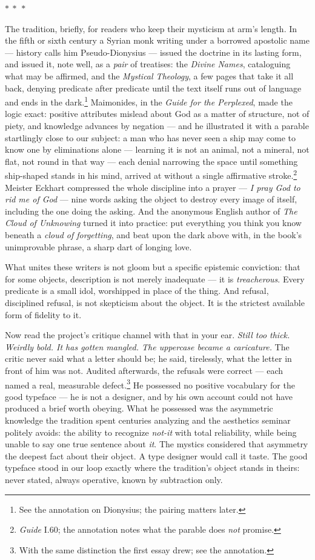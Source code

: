 \documentclass[11pt]{article}
\newcommand{\separator}{\begin{center}\vspace{2pt}$\ast\ \ast\ \ast$\vspace{2pt}\end{center}}
\begin{document}
\separator

The tradition, briefly, for readers who keep their mysticism at arm's length. In the fifth or sixth century a Syrian monk writing under a borrowed apostolic name — history calls him Pseudo-Dionysius — issued the doctrine in its lasting form, and issued it, note well, as a \emph{pair} of treatises: the \emph{Divine Names}, cataloguing what may be affirmed, and the \emph{Mystical Theology}, a few pages that take it all back, denying predicate after predicate until the text itself runs out of language and ends in the dark.\footnote{See the annotation on Dionysius; the pairing matters later.} Maimonides, in the \emph{Guide for the Perplexed}, made the logic exact: positive attributes mislead about God as a matter of structure, not of piety, and knowledge advances by negation — and he illustrated it with a parable startlingly close to our subject: a man who has never seen a ship may come to know one by eliminations alone — learning it is not an animal, not a mineral, not flat, not round in that way — each denial narrowing the space until something ship-shaped stands in his mind, arrived at without a single affirmative stroke.\footnote{\emph{Guide} I.60; the annotation notes what the parable does \emph{not} promise.} Meister Eckhart compressed the whole discipline into a prayer — \emph{I pray God to rid me of God} — nine words asking the object to destroy every image of itself, including the one doing the asking. And the anonymous English author of \emph{The Cloud of Unknowing} turned it into practice: put everything you think you know beneath a \emph{cloud of forgetting}, and beat upon the dark above with, in the book's unimprovable phrase, a sharp dart of longing love.

What unites these writers is not gloom but a specific epistemic conviction: that for some objects, description is not merely inadequate — it is \emph{treacherous}. Every predicate is a small idol, worshipped in place of the thing. And refusal, disciplined refusal, is not skepticism about the object. It is the strictest available form of fidelity to it.

Now read the project's critique channel with that in your ear. \emph{Still too thick. Weirdly bold. It has gotten mangled. The uppercase became a caricature.} The critic never said what a letter should be; he said, tirelessly, what the letter in front of him was not. Audited afterwards, the refusals were correct — each named a real, measurable defect.\footnote{With the same distinction the first essay drew; see the annotation.} He possessed no positive vocabulary for the good typeface — he is not a designer, and by his own account could not have produced a brief worth obeying. What he possessed was the asymmetric knowledge the tradition spent centuries analyzing and the aesthetics seminar politely avoids: the ability to recognize \emph{not-it} with total reliability, while being unable to say one true sentence about \emph{it}. The mystics considered that asymmetry the deepest fact about their object. A type designer would call it taste. The good typeface stood in our loop exactly where the tradition's object stands in theirs: never stated, always operative, known by subtraction only.
\end{document}

